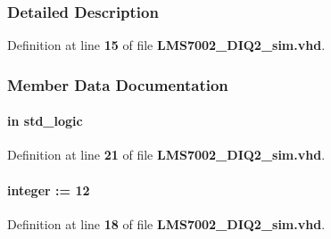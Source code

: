 \subsubsection{Detailed Description}


Definition at line {\bf 15} of file {\bf L\+M\+S7002\+\_\+\+D\+I\+Q2\+\_\+sim.\+vhd}.



\subsubsection{Member Data Documentation}
\paragraph[{clk}]{ {\bfseries \textcolor{keywordflow}{in}\textcolor{vhdlchar}{ }} {\bfseries \textcolor{comment}{std\+\_\+logic}\textcolor{vhdlchar}{ }} \hspace{0.3cm}{\ttfamily [Port]}}\label{classLMS7002__DIQ2__sim_a4a4609c199d30b3adebbeb3a01276ec5}


Definition at line {\bf 21} of file {\bf L\+M\+S7002\+\_\+\+D\+I\+Q2\+\_\+sim.\+vhd}.

\paragraph[{data\+\_\+width}]{ {\bfseries \textcolor{vhdlchar}{ }} {\bfseries \textcolor{comment}{integer}\textcolor{vhdlchar}{ }\textcolor{vhdlchar}{ }\textcolor{vhdlchar}{\+:}\textcolor{vhdlchar}{=}\textcolor{vhdlchar}{ }\textcolor{vhdlchar}{ } \textcolor{vhdldigit}{12} \textcolor{vhdlchar}{ }} \hspace{0.3cm}{\ttfamily [Generic]}}\label{classLMS7002__DIQ2__sim_a767062193f3a56a69d58d31e9a52f103}


Definition at line {\bf 18} of file {\bf L\+M\+S7002\+\_\+\+D\+I\+Q2\+\_\+sim.\+vhd}.

